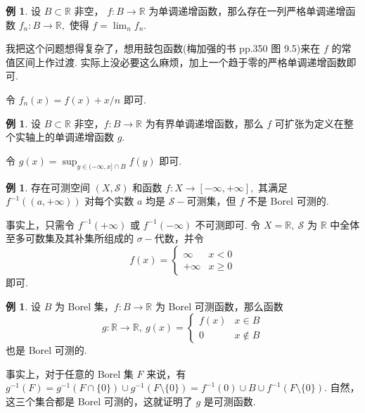 \documentclass[12pt, a4paper, oneside]{book}
\numberwithin{figure}{section}
\theoremstyle{definition}
\newtheorem{example}[theorem]{例}
\begin{document}
\begin{example}\label{ex:approximate_of_monotone_function_by_strictly_monotone_function_sequence}
    设 $B\subset\mathbb R$ 非空， $f:B\to\mathbb R$ 为单调递增函数，那么存在一列严格单调递增函数 $f_n:B\to\mathbb R,$ 使得 $f=\lim_n f_n.$
\end{example}

我把这个问题想得复杂了，想用鼓包函数(梅加强的书 \cite{Mei_2011} pp.350 图 9.5)来在 $f$ 的常值区间上作过渡. 实际上没必要这么麻烦，加上一个趋于零的严格单调递增函数即可.

令 $f_n(x)=f(x)+x/n$ 即可.

\begin{example}
    设 $B\subset\mathbb R$ 非空，$f:B\to\mathbb R$ 为有界单调递增函数，那么 $f$ 可扩张为定义在整个实轴上的单调递增函数 $g.$
\end{example}

令 $g(x)=\sup_{y\in (-\infty,x]\cap B} f(y)$ 即可.

\begin{example}
    存在可测空间 $(X,\mathcal S)$ 和函数 $f:X\to [-\infty,+\infty],$ 其满足 $f^{-1}((a,+\infty))$ 对每个实数 $a$ 均是 $\mathcal S-$可测集，但 $f$ 不是 Borel 可测的.
\end{example}
事实上，只需令 $f^{-1}(+\infty)$ 或 $f^{-1}(-\infty)$ 不可测即可. 令 $X=\mathbb R,\ \mathcal S$ 为 $\mathbb R$ 中全体至多可数集及其补集所组成的 $\sigma-$代数，并令 
\begin{equation}
    f(x)=\begin{cases}
        \infty&x<0\\
        +\infty&x\geq 0
    \end{cases}
\end{equation}
即可.


\begin{example}
    设 $B$ 为 Borel 集，$f:B\to\mathbb R$ 为 Borel 可测函数，那么函数 
    \begin{equation}
        g:\mathbb R\to\mathbb R,\ g(x)=\begin{cases}
            f(x)&x\in B\\
            0&x\notin B
        \end{cases}
    \end{equation}
    也是 Borel 可测的.
\end{example}
事实上，对于任意的 Borel 集 $F$ 来说，有 $g^{-1}(F)=g^{-1}(F\cap\{0\})\cup g^{-1}(F\setminus\{0\})=f^{-1}(0)\cup B\cup f^{-1}(F\setminus\{0\}).$ 
自然，这三个集合都是 Borel 可测的，这就证明了 $g$ 是可测函数.
\end{document}
